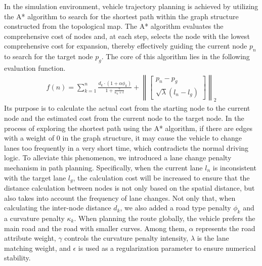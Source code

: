 \documentclass[journal,twoside,web]{ieeecolor}
\begin{document}
In the simulation environment, vehicle trajectory planning is achieved by utilizing the A* algorithm to search for the shortest path within the graph structure constructed from the topological map. 
The A* algorithm evaluates the comprehensive cost of nodes and, at each step, selects the node with the lowest comprehensive cost for expansion, thereby effectively guiding the current node \(p_{n}\) to search for the target node \(p_{g}\).
The core of this algorithm lies in the following evaluation function. 
\begin{align}
	f(n) = \sum_{k = 1}^{n} \frac{d_{k} \cdot\left(1+\alpha \phi_{k}\right)}{1 + \frac{\gamma}{\kappa_k + \epsilon}}+\left\|\left[\begin{array}{c}
		p_{n}-p_{g} \\
		\sqrt{\lambda}\left(l_{n}-l_{g}\right)
	\end{array}\right]\right\|_{2}
\end{align}
Its purpose is to calculate the actual cost from the starting node to the current node and the estimated cost from the current node to the target node. 
In the process of exploring the shortest path using the A* algorithm, if there are edges with a weight of 0 in the graph structure, it may cause the vehicle to change lanes too frequently in a very short time, which contradicts the normal driving logic. 
To alleviate this phenomenon, we introduced a lane change penalty mechanism in path planning. Specifically, when the current lane \(l_{n}\) is inconsistent with the target lane \(l_{g}\), the calculation cost will be increased to ensure that the distance calculation between nodes is not only based on the spatial distance, but also takes into account the frequency of lane changes. Not only that, when calculating the inter-node distance \(d_{k}\), we also added a road type penalty \(\phi_{k}\) and a curvature penalty \(\kappa_k\). When planning the route globally, the vehicle prefers the main road and the road with smaller curves. 
Among them, \(\alpha\) represents the road attribute weight, \(\gamma\) controls the curvature penalty intensity, \(\lambda\) is the lane matching weight, and \(\epsilon\) is used as a regularization parameter to ensure numerical stability.
\end{document}

